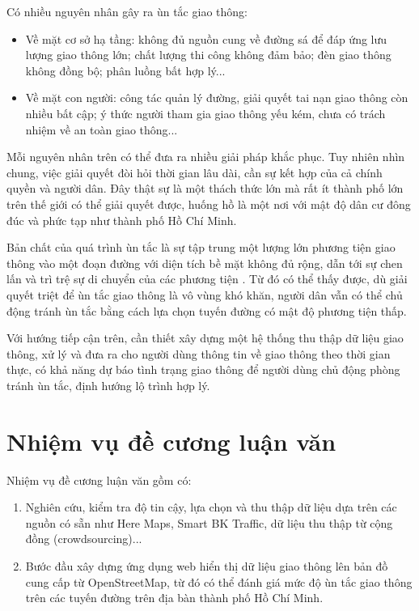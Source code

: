 Có nhiều nguyên nhân gây ra ùn tắc giao thông:
\begin{itemize}
    \item Về mặt cơ sở hạ tầng: không đủ nguồn cung về đường sá để đáp ứng lưu lượng giao thông lớn; chất lượng thi công không đảm bảo; đèn giao thông không đồng bộ; phân luồng bất hợp lý... \cite{MNN}
    \item Về mặt con người: công tác quản lý đường, giải quyết tai nạn giao thông còn nhiều bất cập; ý thức người tham gia giao thông yếu kém, chưa có trách nhiệm về an toàn giao thông...
\end{itemize}
Mỗi nguyên nhân trên có thể đưa ra nhiều giải pháp khắc phục. Tuy nhiên nhìn chung, việc giải quyết đòi hỏi thời gian lâu dài, cần sự kết hợp của cả chính quyền và người dân. Đây thật sự là một thách thức lớn mà rất ít thành phố lớn trên thế giới có thể giải quyết được, huống hồ là một nơi với mật độ dân cư đông đúc và phức tạp như thành phố Hồ Chí Minh.

Bản chất của quá trình ùn tắc là sự tập trung một lượng lớn phương tiện giao thông vào một đoạn đường với diện tích bề mặt không đủ rộng, dẫn tới sự chen lấn và trì trệ sự di chuyển của các phương tiện \cite{MUTC}. Từ đó có thể thấy được, dù giải quyết triệt để ùn tắc giao thông là vô vùng khó khăn, người dân vẫn có thể chủ động tránh ùn tắc bằng cách lựa chọn tuyến đường có mật độ phương tiện thấp.

Với hướng tiếp cận trên, cần thiết xây dựng một hệ thống thu thập dữ liệu giao thông, xử lý và đưa ra cho người dùng thông tin về giao thông theo thời gian thực, có khả năng dự báo tình trạng giao thông để người dùng chủ động phòng tránh ùn tắc, định hướng lộ trình hợp lý.

\section{Nhiệm vụ đề cương luận văn}
Nhiệm vụ đề cương luận văn gồm có:
\begin{enumerate}
    \item Nghiên cứu, kiểm tra độ tin cậy, lựa chọn và thu thập dữ liệu dựa trên các nguồn có sẵn như Here Maps, Smart BK Traffic, dữ liệu thu thập từ cộng đồng (crowdsourcing)...
    \item Bước đầu xây dựng ứng dụng web hiển thị dữ liệu giao thông lên bản đồ cung cấp từ OpenStreetMap, từ đó có thể đánh giá mức độ ùn tắc giao thông trên các tuyến đường trên địa bàn thành phố Hồ Chí Minh.
\end{enumerate}

